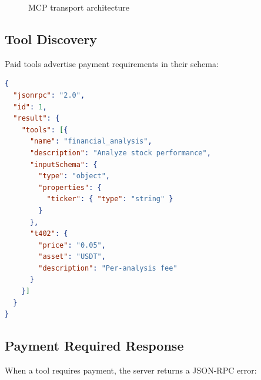 \begin{figure}[htbp]
\centering
{}
\caption{MCP transport architecture}
\label{fig:mcp-architecture}
\end{figure}

\subsection{Tool Discovery}

Paid tools advertise payment requirements in their schema:

\begin{lstlisting}[language=json,caption={MCP tool with payment requirements}]
{
  "jsonrpc": "2.0",
  "id": 1,
  "result": {
    "tools": [{
      "name": "financial_analysis",
      "description": "Analyze stock performance",
      "inputSchema": {
        "type": "object",
        "properties": {
          "ticker": { "type": "string" }
        }
      },
      "t402": {
        "price": "0.05",
        "asset": "USDT",
        "description": "Per-analysis fee"
      }
    }]
  }
}
\end{lstlisting}

\subsection{Payment Required Response}

When a tool requires payment, the server returns a JSON-RPC error:

